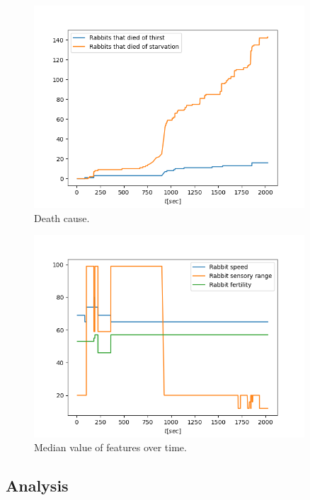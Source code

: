 \begin{figure}[H]
    \centering
    \includegraphics[width=0.9\textwidth]{Images/SimulationResults/Simulation_4_Rabbits that died of thirst_Rabbits that died of starvation.png}
    \caption{Death cause.}
    \label{fig:simulation2RabbitsDiedOfHunger}
\end{figure}

\begin{figure}[H]
    \centering
    \includegraphics[width=0.9\textwidth]{Images/SimulationResults/Simulation_4_Rabbit speed_Rabbit sensory range_Rabbit fertility.png}
    \caption{Median value of features over time.}
    \label{fig:simulation2FeaturesMedian}
\end{figure}

\subsection{Analysis}

